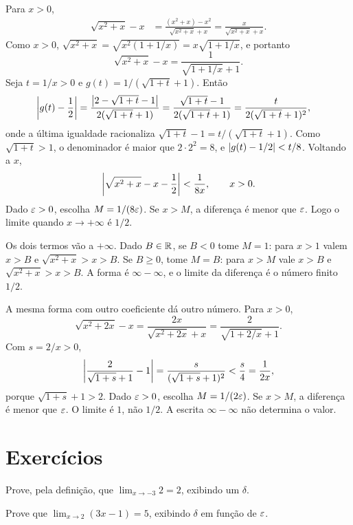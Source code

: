 \documentclass[11pt,a4paper]{article}
\begin{document}
\begin{exemplo}[$\infty-\infty$]
\label{ex:inf-inf}
Para $x>0$,
\begin{align*}
\sqrt{x^2+x}-x
&=\frac{(x^2+x)-x^2}{\sqrt{x^2+x}+x}
=\frac{x}{\sqrt{x^2+x}+x}.
\end{align*}
Como $x>0$, $\sqrt{x^2+x}=\sqrt{x^2(1+1/x)}=x\sqrt{1+1/x}$, e portanto
\[
\sqrt{x^2+x}-x=\frac{1}{\sqrt{1+1/x}+1}.
\]
Seja $t=1/x>0$ e $g(t)=1/(\sqrt{1+t}+1)$. Ent\~ao
\begin{align*}
\left\lvert g(t)-\frac12 \right\rvert
&=\frac{\left\lvert 2-\sqrt{1+t}-1 \right\rvert}{2(\sqrt{1+t}+1)}
=\frac{\sqrt{1+t}-1}{2(\sqrt{1+t}+1)}
=\frac{t}{2(\sqrt{1+t}+1)^2},
\end{align*}
onde a \'ultima igualdade racionaliza $\sqrt{1+t}-1=t/(\sqrt{1+t}+1)$. Como $\sqrt{1+t}>1$, o denominador \'e maior que $2\cdot 2^2=8$, e $\left\lvert g(t)-1/2 \right\rvert<t/8$. Voltando a $x$,
\[
\left\lvert \sqrt{x^2+x}-x-\frac12 \right\rvert<\frac{1}{8x}, \qquad x>0.
\]
Dado $\varepsilon>0$, escolha $M=1/(8\varepsilon)$. Se $x>M$, a diferen\c{c}a \'e menor que $\varepsilon$. Logo o limite quando $x\to +\infty$ \'e $1/2$.

Os dois termos v\~ao a $+\infty$. Dado $B\in\mathbb{R}$, se $B<0$ tome $M=1$: para $x>1$ valem $x>B$ e $\sqrt{x^2+x}>x>B$. Se $B\ge 0$, tome $M=B$: para $x>M$ vale $x>B$ e $\sqrt{x^2+x}>x>B$. A forma \'e $\infty-\infty$, e o limite da diferen\c{c}a \'e o n\'umero finito $1/2$.

A mesma forma com outro coeficiente d\'a outro n\'umero. Para $x>0$,
\[
\sqrt{x^2+2x}-x=\frac{2x}{\sqrt{x^2+2x}+x}=\frac{2}{\sqrt{1+2/x}+1}.
\]
Com $s=2/x>0$,
\[
\left\lvert \frac{2}{\sqrt{1+s}+1}-1 \right\rvert=\frac{s}{(\sqrt{1+s}+1)^2}<\frac{s}{4}=\frac{1}{2x},
\]
porque $\sqrt{1+s}+1>2$. Dado $\varepsilon>0$, escolha $M=1/(2\varepsilon)$. Se $x>M$, a diferen\c{c}a \'e menor que $\varepsilon$. O limite \'e $1$, n\~ao $1/2$. A escrita $\infty-\infty$ n\~ao determina o valor.
\end{exemplo}

\section{Exerc\'icios}
\label{sec:ex-lim}

\begin{exercicio}
Prove, pela defini\c{c}\~ao, que $\lim_{x\to -3}2=2$, exibindo um $\delta$.
\end{exercicio}

\begin{exercicio}
Prove que $\lim_{x\to 2}(3x-1)=5$, exibindo $\delta$ em fun\c{c}\~ao de $\varepsilon$.
\end{exercicio}
\end{document}
